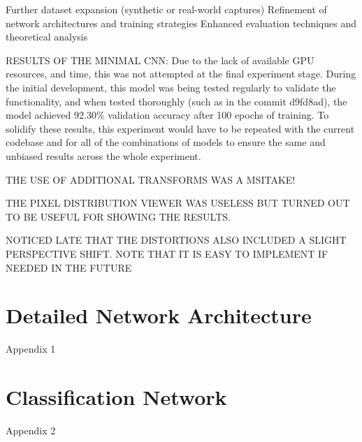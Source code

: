 \documentclass[conference]{IEEEtran}
\begin{document}
Further dataset expansion (synthetic or real-world captures)
Refinement of network architectures and training strategies
Enhanced evaluation techniques and theoretical analysis

RESULTS OF THE MINIMAL CNN:
Due to
the lack of available GPU resources, and time, this was not attempted at the final experiment stage. During the initial development, this model was being
tested regularly to validate the functionality, and when tested thoroughly (such as in the commit d9fd8ad), the model achieved 92.30\% validation accuracy after
100 epochs of training. To solidify these results, this experiment would have to be repeated with the current codebase and for all of the combinations of models to
ensure the same and unbiased results across the whole experiment.

THE USE OF ADDITIONAL TRANSFORMS WAS A MSITAKE!

THE PIXEL DISTRIBUTION VIEWER WAS USELESS BUT TURNED OUT TO BE USEFUL FOR SHOWING THE RESULTS.

NOTICED LATE THAT THE DISTORTIONS ALSO INCLUDED A SLIGHT PERSPECTIVE SHIFT. NOTE THAT IT IS EASY TO IMPLEMENT IF NEEDED IN THE FUTURE

\printbibsection

\appendices

\renewcommand{\thesection}{\Alph{section}}

\section{Detailed Network Architecture}

Appendix 1

\section{Classification Network}

Appendix 2
\end{document}
